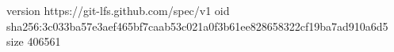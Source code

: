 version https://git-lfs.github.com/spec/v1
oid sha256:3c033ba57e3aef465bf7caab53c021a0f3b61ee828658322cf19ba7ad910a6d5
size 406561
